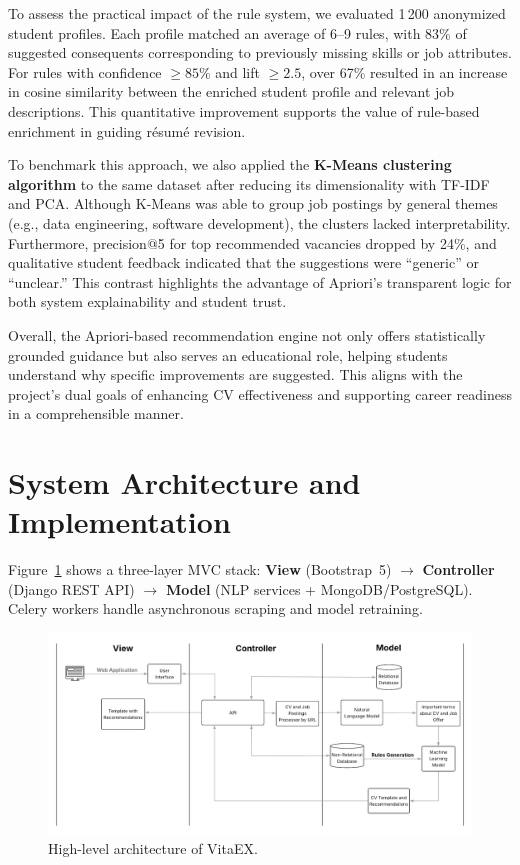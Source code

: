 \documentclass[runningheads]{llncs}
\begin{document}
	To assess the practical impact of the rule system, we evaluated 1\,200 anonymized student profiles. Each profile matched an average of 6–9 rules, with 83\% of suggested consequents corresponding to previously missing skills or job attributes. For rules with confidence $\geq 85\%$ and lift $\geq 2.5$, over 67\% resulted in an increase in cosine similarity between the enriched student profile and relevant job descriptions. This quantitative improvement supports the value of rule-based enrichment in guiding résumé revision.
	
	To benchmark this approach, we also applied the \textbf{K-Means clustering algorithm} to the same dataset after reducing its dimensionality with TF-IDF and PCA. Although K-Means was able to group job postings by general themes (e.g., data engineering, software development), the clusters lacked interpretability. Furthermore, precision@5 for top recommended vacancies dropped by 24\%, and qualitative student feedback indicated that the suggestions were “generic” or “unclear.” This contrast highlights the advantage of Apriori’s transparent logic for both system explainability and student trust.
	
	Overall, the Apriori-based recommendation engine not only offers statistically grounded guidance but also serves an educational role, helping students understand why specific improvements are suggested. This aligns with the project’s dual goals of enhancing CV effectiveness and supporting career readiness in a comprehensible manner.
	
	
	

	\section{System Architecture and Implementation}
	
	Figure~\ref{fig:blocks} shows a three-layer MVC stack: \textbf{View} (Bootstrap~5) $\rightarrow$ \textbf{Controller} (Django REST API) $\rightarrow$ \textbf{Model} (NLP services + MongoDB/PostgreSQL). Celery workers handle asynchronous scraping and model retraining.
	
	\begin{figure}[H]
		\centering
		\includegraphics[width=1\linewidth]{imagenes/Arquitectura_Sistema.png}
		\caption{High-level architecture of VitaEX.}
		\label{fig:blocks}
	\end{figure}
	
\end{document}
